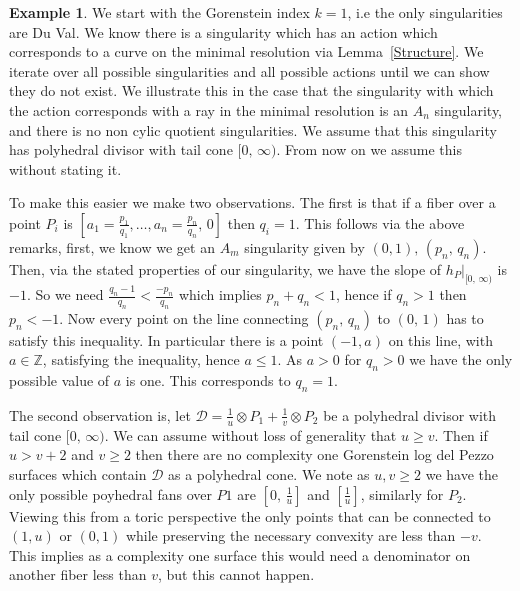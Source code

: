 \documentclass[12pt,a4paper]{book}      %
\theoremstyle{definition}
\newtheorem{ex}[thm]{Example}
\newcommand{\mb}[1]{\mathbb{#1}}
\begin{document}
\begin{ex}\rm

We start with the Gorenstein index $k = 1$, i.e the only singularities are Du Val. We know there is a singularity which has an action which corresponds to a curve on the minimal resolution via Lemma~\ref{Structure}. We iterate over all possible singularities and all possible actions until we can show they do not exist. We illustrate this in the case that the singularity with which the action corresponds with a ray in the minimal resolution is an $A_n$ singularity, and there is no non cylic quotient singularities. We assume that this singularity has polyhedral divisor with tail cone $[ 0, \, \infty)$. From now on we assume this without stating it.

To make this easier we make two observations. The first is that if a fiber over a point $P_i$ is $[a_1 = \frac{p_1}{q_1} , \dots, a_n = \frac{p_n}{q_n}, \, 0]$ then $q_i = 1$. This follows via the above remarks, first, we know we get an $A_m$ singularity given by $(0, 1), \, (p_n,  \, q_n)$. Then, via the stated properties of our singularity, we have the slope of $h_P|_{[0, \, \infty)}$ is $-1$. So we need $\frac{q_n-1}{q_n} < \frac{-p_n}{q_n}$ which implies $p_n + q_n < 1$, hence if $q_n > 1$ then $p_n < -1$. Now every point on the line connecting $(p_n, \, q_n)$ to $(0, \, 1)$ has to satisfy this inequality. In particular there is a point $(-1, a)$ on this line, with $a  \in \mb{Z}$, satisfying the inequality, hence $ a \leq 1$. As $ a>0$ for $q_n>0$ we have the only possible value of $a$ is one. This corresponds to $q_n = 1$.


The second observation is, let $\mathcal{D} = \frac{1}{u} \otimes P_1 + \frac{1}{v} \otimes P_2$ be a polyhedral divisor with tail cone $[ 0 , \, \infty)$. We can assume without loss of generality that $u \geq v$. Then if $u>v+2$ and $v \geq 2$ then there are no complexity one Gorenstein log del Pezzo surfaces which contain $\mathcal{D}$ as a polyhedral cone. We note as $u,  v \geq 2$ we have the only possible poyhedral fans over $P1$ are $[0, \, \frac{1}{u}
]$ and $[\frac{1}{u}]$, similarly for $P_2$. Viewing this from a toric perspective the only points that can be connected to $(1,u)$ or $(0,1)$ while preserving the necessary convexity are less than $-v$. This implies as a complexity one surface this would need a denominator on another fiber less than $v$, but this cannot happen. 

\begin{itemize}


\end{itemize}
\end{ex}
\end{document}
